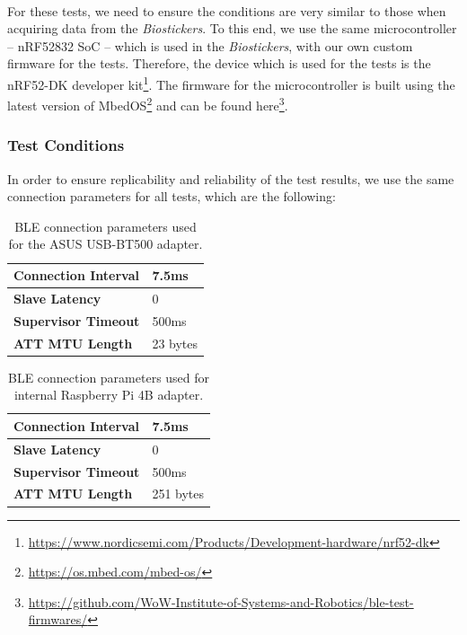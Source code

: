 \paragraph{} For these tests, we need to ensure the conditions are very similar to those when acquiring data from the \textit{Biostickers}. To this end, we use the same microcontroller -- nRF52832 \acs{SoC} -- which is used in the \textit{Biostickers}, with our own custom firmware for the tests. Therefore, the device which is used for the tests is the nRF52-DK developer kit\footnote{\url{https://www.nordicsemi.com/Products/Development-hardware/nrf52-dk}}. The firmware for the microcontroller is built using the latest version of MbedOS\footnote{\url{https://os.mbed.com/mbed-os/}} and can be found here\footnote{\url{https://github.com/WoW-Institute-of-Systems-and-Robotics/ble-test-firmwares/}}.

\subsubsection{Test Conditions}

In order to ensure replicability and reliability of the test results, we use the same connection parameters for all tests, which are the following:

\begin{table}[H]
    \centering
    \begin{tabular}{|l|l|}
    \hline
    \textbf{Connection Interval} & 7.5ms \\ \hline
    \textbf{Slave Latency}       & 0     \\ \hline
    \textbf{Supervisor Timeout}  & 500ms \\ \hline
    \textbf{\acs{ATT} \acs{MTU} Length}      & 23 bytes   \\ \hline
    \end{tabular}
    \caption{\acs{BLE} connection parameters used for the ASUS USB-BT500 adapter.}
    \label{tab:ble-connection-values-hci1}
\end{table}

\begin{table}[H]
    \centering
    \begin{tabular}{|l|l|}
    \hline
    \textbf{Connection Interval} & 7.5ms \\ \hline
    \textbf{Slave Latency}       & 0     \\ \hline
    \textbf{Supervisor Timeout}  & 500ms \\ \hline
    \textbf{\acs{ATT} \acs{MTU} Length}      & 251 bytes   \\ \hline
    \end{tabular}
    \caption{\acs{BLE} connection parameters used for internal Raspberry Pi 4B adapter.}
    \label{tab:ble-connection-values-hci0}
\end{table}

